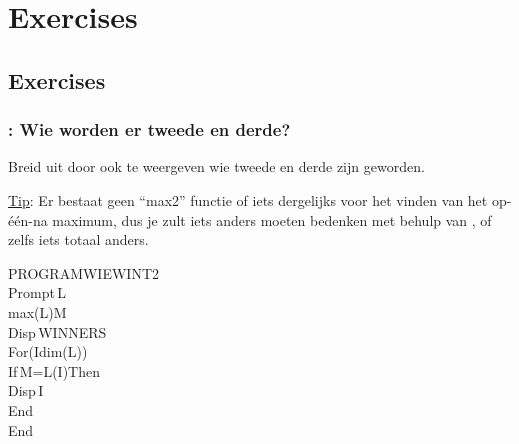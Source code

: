 \section{Exercises}
\subsection{Exercises}


\begin{frame}
\frametitle{: Wie worden er tweede en derde?}

Breid  uit door ook te weergeven wie tweede en derde zijn geworden.

\underline{Tip}: Er bestaat geen ``max2'' functie of iets dergelijks voor het vinden van het op-\'e\'en-na maximum,
dus je zult iets anders moeten bedenken met behulp van , of zelfs iets totaal anders.

\begin{ticalc}[3.5cm]
	PROGRAM\:WIEWINT2\\%
	\:Prompt\,L\\%
	\:max(L)\>M\\%
	\:Disp\,\qt WINNERS\:\qt\\%
	\:For(I\comma dim(L))\\%
	\:If\,M=L(I)\:Then\\%
	\:Disp\,I\\%
	\:End\\%
	\:End
\end{ticalc}

\end{frame}




